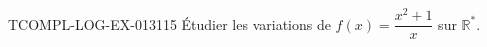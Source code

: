 \begin{exercice}{TCOMPL-LOG-EX-013}{1}{15}
Étudier les variations de $f(x) = \dfrac{x^2+1}{x}$ sur $\mathbb{R}^*$.

\end{exercice}
